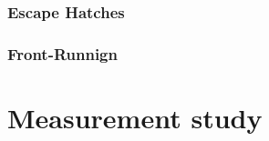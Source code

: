 \subsubsection{Escape Hatches}

\subsubsection{Front-Runnign}





 \section{Measurement study}









